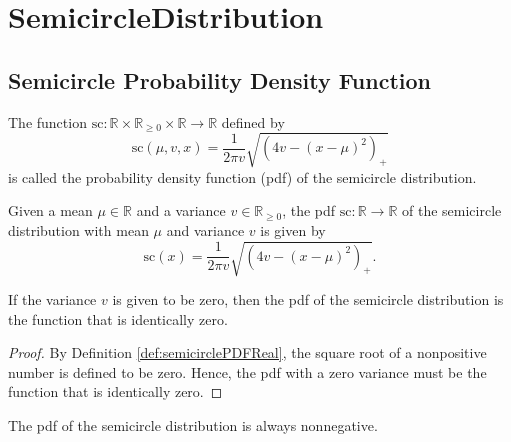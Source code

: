 \chapter{SemicircleDistribution}

\section{Semicircle Probability Density Function}



\begin{definition}\label{def:semicirclePDFReal}
  \mathlibok 
    The function $\mathrm{sc} : \mathbb{R} \times \mathbb{R}_{\geq 0} \times \mathbb{R} \rightarrow \mathbb{R}$ defined by
   \[
    \mathrm{sc}(\mu,v,x) 
    = \frac{1}{2πv} \sqrt{(4v - (x - μ)^2)_+}
   \]
   is called the probability density function (pdf) of the semicircle distribution.
\end{definition}
\begin{lemma}\label{lem:semicirclePDFReal_def}
  \mathlibok 
    Given a mean $\mu \in \mathbb{R}$ and a variance $v \in \mathbb{R}_{\geq 0}$, the pdf $\mathrm{sc} : \mathbb{R} \rightarrow \mathbb{R}$ 
    of the semicircle distribution with mean $\mu$ and variance $v$ is given by
  \[
    \mathrm{sc}(x) = 
    \frac{1}{2πv} \sqrt{(4v - (x - μ)^2)_+}.
  \]
\end{lemma}
\begin{lemma}\label{lem:semicirclePDFReal_zero_var}
    \mathlibok
    If the variance $v$ is given to be zero, then the pdf of the semicircle distribution is the function that is identically zero.
\end{lemma}
\begin{proof}
    By Definition \ref{def:semicirclePDFReal}, the square root of a nonpositive number is defined to be zero.
    Hence, the pdf with a zero variance must be the function that is identically zero.
\end{proof}
\begin{lemma}\label{lem:semicirclePDFReal_nonneg}
    \mathlibok
    The pdf of the semicircle distribution is always nonnegative. 
\end{lemma}
